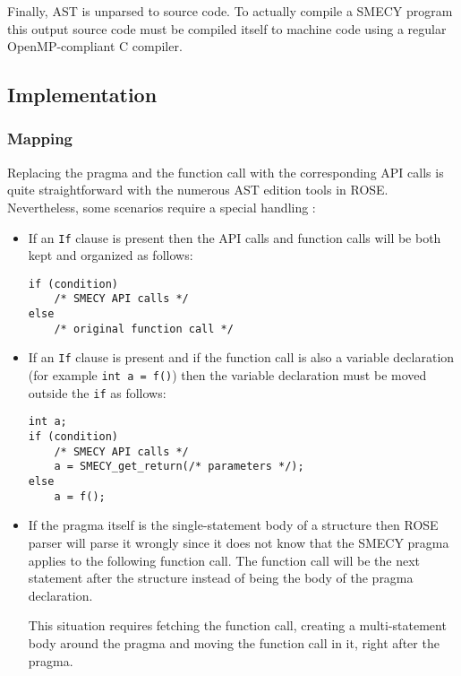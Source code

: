 \documentclass[a4paper]{article}
\begin{document}
	Finally, AST is unparsed to source code. To actually compile a SMECY program this output source code must be compiled itself to machine code using a regular OpenMP-compliant C compiler.
	
	
	\subsection{Implementation}
	
	\subsubsection{Mapping} Replacing the pragma and the function call with the corresponding API calls is quite straightforward with the numerous AST edition tools in ROSE. Nevertheless, some scenarios require a special handling :
	\begin{itemize}
		\item If an \verb+If+ clause is present then the API calls and
          function calls will be both kept and organized as follows:
		\begin{lstlisting}[frame=none, numbers=none]
if (condition)
	/* SMECY API calls */
else
	/* original function call */
		\end{lstlisting}
		\item If an \verb+If+ clause is present and if the function call is also a variable declaration (for example \verb+int a = f()+) then the variable declaration must be moved outside the \verb+if+ as follows:
		\begin{lstlisting}[frame=none, numbers=none]
int a;
if (condition)
	/* SMECY API calls */
	a = SMECY_get_return(/* parameters */);
else
	a = f();
		\end{lstlisting}
		\item If the pragma itself is the single-statement body of a
          structure  then ROSE parser will parse it wrongly since it
          does not know that the SMECY pragma applies to the following
          function call. The function call will be the next statement
          after the structure instead of being the body of the pragma
          declaration.

		This situation requires fetching the function call, creating a multi-statement body around the pragma and moving the function call in it, right after the pragma.
	\end{itemize}
	
\end{document}
